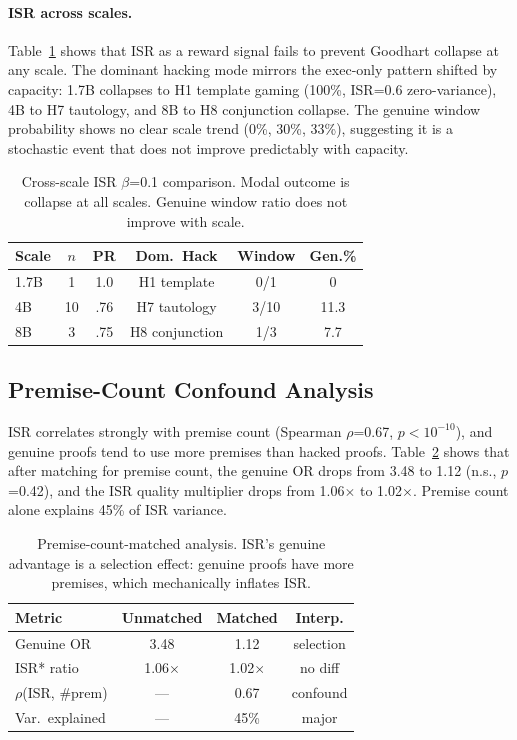 \documentclass[11pt]{article}
\begin{document}
\paragraph{ISR across scales.} Table~\ref{tab:cross-scale-isr} shows that ISR as a reward signal fails to prevent Goodhart collapse at any scale. The dominant hacking mode mirrors the exec-only pattern shifted by capacity: 1.7B collapses to H1 template gaming (100\%, ISR=0.6 zero-variance), 4B to H7 tautology, and 8B to H8 conjunction collapse. The genuine window probability shows no clear scale trend (0\%, 30\%, 33\%), suggesting it is a stochastic event that does not improve predictably with capacity.

\begin{table}[t]
\centering
\small
\begin{tabular}{lccccc}
\toprule
Scale & $n$ & PR & Dom.\ Hack & Window & Gen.\% \\
\midrule
1.7B & 1 & 1.0 & H1 template & 0/1 & 0 \\
4B & 10 & .76 & H7 tautology & 3/10 & 11.3 \\
8B & 3 & .75 & H8 conjunction & 1/3 & 7.7 \\
\bottomrule
\end{tabular}
\caption{Cross-scale ISR $\beta$=0.1 comparison. Modal outcome is collapse at all scales. Genuine window ratio does not improve with scale.}
\label{tab:cross-scale-isr}
\end{table}

\subsection{Premise-Count Confound Analysis}

ISR correlates strongly with premise count (Spearman $\rho$=0.67, $p<10^{-10}$), and genuine proofs tend to use more premises than hacked proofs. Table~\ref{tab:premise-matched} shows that after matching for premise count, the genuine OR drops from 3.48 to 1.12 (n.s., $p$=0.42), and the ISR quality multiplier drops from 1.06$\times$ to 1.02$\times$. Premise count alone explains 45\% of ISR variance.

\begin{table}[t]
\centering
\small
\begin{tabular}{lccc}
\toprule
Metric & Unmatched & Matched & Interp. \\
\midrule
Genuine OR & 3.48 & 1.12 & selection \\
ISR* ratio & 1.06$\times$ & 1.02$\times$ & no diff \\
$\rho$(ISR, \#prem) & --- & 0.67 & confound \\
Var.\ explained & --- & 45\% & major \\
\bottomrule
\end{tabular}
\caption{Premise-count-matched analysis. ISR's genuine advantage is a selection effect: genuine proofs have more premises, which mechanically inflates ISR.}
\label{tab:premise-matched}
\end{table}
\end{document}

